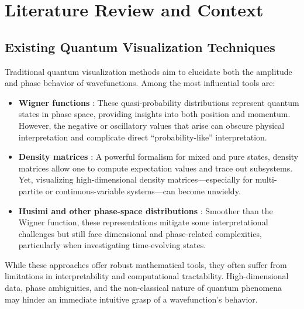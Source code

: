 \documentclass{article}
\begin{document}
\section{Literature Review and Context}
\label{sec:literature_review}

\subsection{Existing Quantum Visualization Techniques}
Traditional quantum visualization methods aim to elucidate both the amplitude and phase behavior of wavefunctions. Among the most influential tools are:
\begin{itemize}
    \item \textbf{Wigner functions} \citep{wigner1932, zachos2005quantum}: 
    These quasi-probability distributions represent quantum states in phase space, providing insights into both position and momentum. However, the negative or oscillatory values that arise can obscure physical interpretation and complicate direct “probability-like” interpretation.
    \item \textbf{Density matrices} \citep{vonNeumann1932}: 
    A powerful formalism for mixed and pure states, density matrices allow one to compute expectation values and trace out subsystems. Yet, visualizing high-dimensional density matrices—especially for multi-partite or continuous-variable systems—can become unwieldy.
    \item \textbf{Husimi and other phase-space distributions} \citep{husimi1940some}:  
    Smoother than the Wigner function, these representations mitigate some interpretational challenges but still face dimensional and phase-related complexities, particularly when investigating time-evolving states.
\end{itemize}

While these approaches offer robust mathematical tools, they often suffer from limitations in interpretability and computational tractability. High-dimensional data, phase ambiguities, and the non-classical nature of quantum phenomena may hinder an immediate intuitive grasp of a wavefunction’s behavior.
\end{document}
